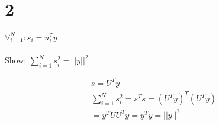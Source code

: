 \section*{2}

$\forall_{i=1}^N : s_i = u_i^T y$ \\ \\
Show: $\sum_{i=1}^N s_i^2 = ||y||^2$

\begin{gather*}
s = U^T y \\ 
\sum_{i=1}^N s_i^2 = s^Ts = (U^T y)^T (U^T y) \\
= y^T U U^T y = y^Ty = ||y||^2
\end{gather*}

